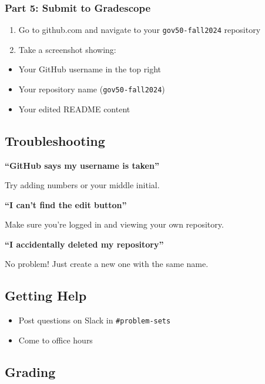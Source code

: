 \documentclass[
  11pt,
  letterpaper]{article}
\providecommand{\tightlist}{%
  \setlength{\itemsep}{0pt}\setlength{\parskip}{0pt}}
\begin{document}
\subsubsection{Part 5: Submit to
Gradescope}\label{part-5-submit-to-gradescope}

\begin{enumerate}
\def\labelenumi{\arabic{enumi}.}
\tightlist
\item
  Go to github.com and navigate to your \texttt{gov50-fall2024}
  repository
\item
  Take a screenshot showing:
\end{enumerate}

\begin{itemize}
\tightlist
\item
  Your GitHub username in the top right
\item
  Your repository name (\texttt{gov50-fall2024})
\item
  Your edited README content
\end{itemize}

\subsection{Troubleshooting}\label{troubleshooting}

\textbf{``GitHub says my username is taken''}

Try adding numbers or your middle initial.

\textbf{``I can't find the edit button''}

Make sure you're logged in and viewing your own repository.

\textbf{``I accidentally deleted my repository''}

No problem! Just create a new one with the same name.

\subsection{Getting Help}\label{getting-help}

\begin{itemize}
\tightlist
\item
  Post questions on Slack in \texttt{\#problem-sets}
\item
  Come to office hours
\end{itemize}

\subsection{Grading}\label{grading}
\end{document}
